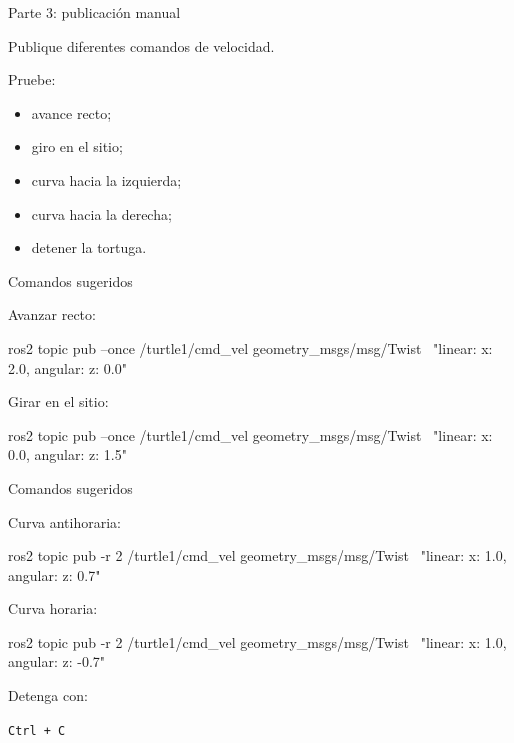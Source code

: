 \documentclass[aspectratio=169]{beamer}
\begin{document}
\begin{frame}{Parte 3: publicación manual}

Publique diferentes comandos de velocidad.

Pruebe:

\begin{itemize}
    \item avance recto;
    \item giro en el sitio;
    \item curva hacia la izquierda;
    \item curva hacia la derecha;
    \item detener la tortuga.
\end{itemize}

\vspace{0.3cm}


\end{frame}

\begin{frame}[fragile]{Comandos sugeridos}

Avanzar recto:

\begin{bashcodedark}
    ros2 topic pub --once /turtle1/cmd_vel geometry_msgs/msg/Twist \
    "{linear: {x: 2.0}, angular: {z: 0.0}}"
\end{bashcodedark}

Girar en el sitio:

\begin{bashcodedark}
    ros2 topic pub --once /turtle1/cmd_vel geometry_msgs/msg/Twist \
    "{linear: {x: 0.0}, angular: {z: 1.5}}"
\end{bashcodedark}

\end{frame}

\begin{frame}[fragile]{Comandos sugeridos}

Curva antihoraria:

\begin{bashcodedark}
    ros2 topic pub -r 2 /turtle1/cmd_vel geometry_msgs/msg/Twist \
    "{linear: {x: 1.0}, angular: {z: 0.7}}"
\end{bashcodedark}

Curva horaria:

\begin{bashcodedark}
    ros2 topic pub -r 2 /turtle1/cmd_vel geometry_msgs/msg/Twist \
    "{linear: {x: 1.0}, angular: {z: -0.7}}"
\end{bashcodedark}

Detenga con:

\begin{center}
    \texttt{Ctrl + C}
\end{center}

\end{frame}
\end{document}
